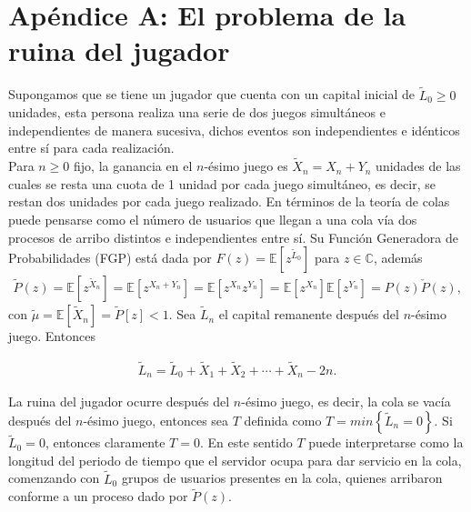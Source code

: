 \documentclass{article}
\newcommand{\esp}{\mathbb{E}}
\numberwithin{equation}{section}
\begin{document}
\section*{Ap\'endice A: El problema de la ruina del jugador}

Supongamos que se tiene un jugador que cuenta con un capital inicial de $\tilde{L}_{0}\geq0$ unidades, esta persona realiza una serie de dos juegos simult\'aneos e independientes de manera sucesiva, dichos eventos son independientes e id\'enticos entre s\'i para cada realizaci\'on.\\

Para $n\geq0$ fijo, la ganancia en el $n$-\'esimo juego es $\tilde{X}_{n}=X_{n}+Y_{n}$ unidades de las cuales se resta una cuota de 1 unidad por cada juego simult\'aneo, es decir, se restan dos unidades por cada juego realizado. En t\'erminos de la teor\'ia de colas puede pensarse como el n\'umero de usuarios que llegan a una cola v\'ia dos procesos de arribo distintos e independientes entre s\'i. Su Funci\'on Generadora de Probabilidades (FGP) est\'a dada por $F\left(z\right)=\esp\left[z^{\tilde{L}_{0}}\right]$ para $z\in\mathbb{C}$, adem\'as
\begin{eqnarray}
\tilde{P}\left(z\right)=\esp\left[z^{\tilde{X}_{n}}\right]=\esp\left[z^{X_{n}+Y_{n}}\right]=\esp\left[z^{X_{n}}z^{Y_{n}}\right]=\esp\left[z^{X_{n}}\right]\esp\left[z^{Y_{n}}\right]=P\left(z\right)\check{P}\left(z\right),
\end{eqnarray}
con $\tilde{\mu}=\esp\left[\tilde{X}_{n}\right]=\tilde{P}\left[z\right]<1$. Sea $\tilde{L}_{n}$ el capital remanente despu\'es del $n$-\'esimo
juego. Entonces

\begin{eqnarray}
\tilde{L}_{n}=\tilde{L}_{0}+\tilde{X}_{1}+\tilde{X}_{2}+\cdots+\tilde{X}_{n}-2n.
\end{eqnarray}


La ruina del jugador ocurre despu\'es del $n$-\'esimo juego, es decir, la cola se vac\'ia despu\'es del $n$-\'esimo juego, entonces sea $T$ definida como $T=min\left\{\tilde{L}_{n}=0\right\}$. Si $\tilde{L}_{0}=0$, entonces claramente $T=0$. En este sentido $T$ puede interpretarse como la longitud del periodo de tiempo que el servidor ocupa para dar servicio en la cola, comenzando con $\tilde{L}_{0}$ grupos de usuarios presentes en la cola, quienes arribaron conforme a un proceso dado por $\tilde{P}\left(z\right)$.\\
\end{document}
